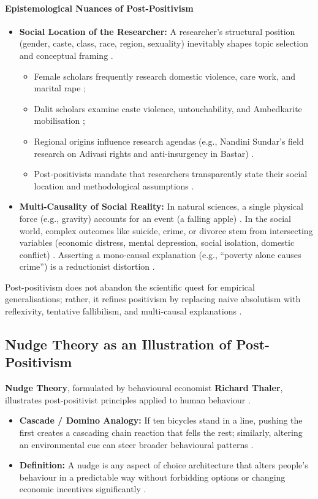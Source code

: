 \paragraph{Epistemological Nuances of Post-Positivism}
\begin{itemize}
    \item \textbf{Social Location of the Researcher:} A researcher's structural position (gender, caste, class, race, region, sexuality) inevitably shapes topic selection and conceptual framing .
    \begin{itemize}
        \item Female scholars frequently research domestic violence, care work, and marital rape ;
        \item Dalit scholars examine caste violence, untouchability, and Ambedkarite mobilisation ;
        \item Regional origins influence research agendas (e.g., Nandini Sundar's field research on Adivasi rights and anti-insurgency in Bastar) .
        \item Post-positivists mandate that researchers transparently state their social location and methodological assumptions .
    \end{itemize}
    \item \textbf{Multi-Causality of Social Reality:} In natural sciences, a single physical force (e.g., gravity) accounts for an event (a falling apple) . In the social world, complex outcomes like suicide, crime, or divorce stem from intersecting variables (economic distress, mental depression, social isolation, domestic conflict) . Asserting a mono-causal explanation (e.g., ``poverty alone causes crime'') is a reductionist distortion .
\end{itemize}

\begin{CriticalPoint}
Post-positivism does not abandon the scientific quest for empirical generalisations; rather, it refines positivism by replacing naive absolutism with reflexivity, tentative fallibilism, and multi-causal explanations .
\end{CriticalPoint}

\subsection{Nudge Theory as an Illustration of Post-Positivism}
\textbf{Nudge Theory}, formulated by behavioural economist \textbf{Richard Thaler}, illustrates post-positivist principles applied to human behaviour .
\begin{itemize}
    \item \textbf{Cascade / Domino Analogy:} If ten bicycles stand in a line, pushing the first creates a cascading chain reaction that fells the rest; similarly, altering an environmental cue can steer broader behavioural patterns .
    \item \textbf{Definition:} A nudge is any aspect of choice architecture that alters people's behaviour in a predictable way without forbidding options or changing economic incentives significantly .
\end{itemize}

